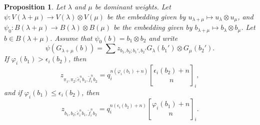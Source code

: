 \documentclass[final]{amsart}
\theoremstyle{plain}
\newtheorem{proposition}[corollary]{Proposition}
\theoremstyle{definition}
\newcommand{\qbinom}{\genfrac{[}{]}{0pt}{}}
\newcommand{\te}{\tilde e}
\newcommand{\tf}{\tilde f}
\begin{document}
\begin{proposition}
    \label{proposition:canonical-basis-tensor-product-summands}
    Let $\lambda$ and $\mu$ be dominant weights.
    Let $\psi\colon V(\lambda + \mu) \to V(\lambda) \otimes V(\mu)$ be the embedding given by $u_{\lambda + \mu} \mapsto u_\lambda \otimes u_\mu$, and $\psi_0\colon B(\lambda+\mu) \to B(\lambda) \otimes B(\mu)$ be the embedding given by $b_{\lambda + \mu} \mapsto b_\lambda \otimes b_\mu$.
    Let $b \in B(\lambda+\mu)$.
    Assume that $\psi_0(b) = b_1 \otimes b_2$ and write
    \[
        \psi(G_{\lambda+\mu}(b)) = \sum z_{b_1,b_2;b_1',b_2'} G_\lambda(b_1') \otimes G_\mu(b_2').
    \]
    If $\varphi_i(b_1) > \epsilon_i(b_2)$, then
    \[
        z_{\pi_1,\pi_2;\te_i^n b_1,\tf_i^n b_2} = q_i^{n(\varphi_i(b_1)+n)} \qbinom{\epsilon_i(b_2)+n}{n}_i,
    \]
    and if $\varphi_i(b_1) \le \epsilon_i(b_2)$, then
    \[
        z_{b_1,b_2;\te_i^n b_1,\tf_i^n b_2} = q_i^{n(\epsilon_i(b_2)+n)} \qbinom{\varphi_i(b_1)+n}{n}_i.
    \]
\end{proposition}
\end{document}
